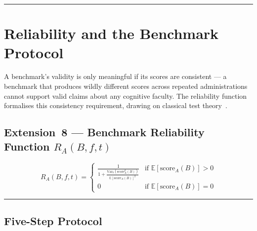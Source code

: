 \documentclass[11pt]{article}
\theoremstyle{definition}
\theoremstyle{plain}
\begin{document}
\noindent\rule{\linewidth}{0.4pt}



\section{Reliability and the Benchmark Protocol}\label{sec:benchmark}

A benchmark's validity is only meaningful if its scores are consistent --- a benchmark that produces wildly different scores across repeated administrations cannot support valid claims about any cognitive faculty. The reliability function formalises this consistency requirement, drawing on classical test theory~\citep{crocker1986introduction}.

\subsection{Extension~8 --- Benchmark Reliability Function \texorpdfstring{$R_A(B,f,t)$}{R\_A(B,f,t)}}\label{sec:reliability-fn}

\begin{equation}\label{eq:reliability}
R_A(B,f,t) = \begin{cases} \displaystyle\frac{1}{1 + \frac{\text{Var}_k(\text{score}_A^k(B))}{\mathbb{E}[\text{score}_A(B)]^2}} & \text{if } \mathbb{E}[\text{score}_A(B)] > 0 \\[8pt] 0 & \text{if } \mathbb{E}[\text{score}_A(B)] = 0 \end{cases}
\end{equation}

\noindent\rule{\linewidth}{0.4pt}



\subsection{Five-Step Protocol}\label{sec:five-step}
\end{document}
